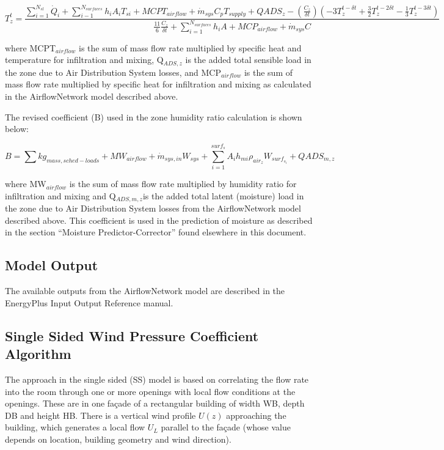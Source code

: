 {\scriptsize
\begin{equation}
T_z^t = \frac{\sum_{i=1}^{N_{sl}} \dot{Q}_i + \sum_{i-1}^{N_{surfaces}} h_i A_i T_{si} + MCPT_{airflow} + \dot{m}_{sys} C_p T_{supply} + QADS_z - \left( \frac{C_z}{\delta t} \right ) \left(-3 T_z^{t-\delta t} + \frac{3}{2} T_z^{t-2\delta t} -\frac{1}{3} T_z^{t-3\delta t} \right )}{\frac{11}{6} \frac{C_z}{\delta t} + \sum_{i=1}^{N_{surfaces}} h_i A + MCP_{airflow} + \dot{m}_{sys} C}
\end{equation}}

where MCPT\(_{airflow}\) is the sum of mass flow rate multiplied by specific heat and temperature for infiltration and mixing, Q\(_{ADS,z}\) is the added total sensible load in the zone due to Air Distribution System losses, and MCP\(_{airflow}\) is the sum of mass flow rate multiplied by specific heat for infiltration and mixing as calculated in the AirflowNetwork model described above.

The revised coefficient (B) used in the zone humidity ratio calculation is shown below:

\begin{equation}
B = \sum kg_{mass,sched-loads} + MW_{airflow} + \dot{m}_{sys,in} W_{sys} + \sum_{i = 1}^{surf_s} A_i h_{mi} \rho_{air_z} W_{surf_{s_i}} + QADS_{m,z}
\end{equation}

where MW\(_{airflow}\) is the sum of mass flow rate multiplied by humidity ratio for infiltration and mixing and Q\(_{ADS,m,z}\)is the added total latent (moisture) load in the zone due to Air Distribution System losses from the AirflowNetwork model described above. This coefficient is used in the prediction of moisture as described in the section ``Moisture Predictor-Corrector'' found elsewhere in this document.

\subsection{Model Output}\label{model-output}

The available outputs from the AirflowNetwork model are described in the EnergyPlus Input Output Reference manual.

\subsection{Single Sided Wind Pressure Coefficient Algorithm}

The approach in the single sided (SS) model is based on correlating the flow rate into
the room through one or more openings with local flow conditions at the openings. These
are in one fa\c{c}ade of a rectangular building of width WB, depth DB and height HB.
There is a vertical wind profile $U(z)$ approaching the building, which generates a
local flow $U_L$ parallel to the fa\c{c}ade (whose value depends on location, building
geometry and wind direction).

